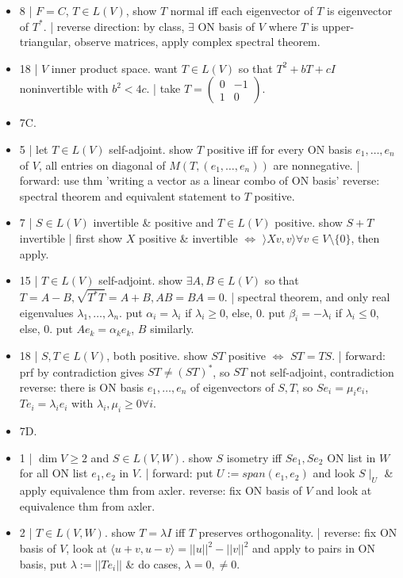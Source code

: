 \begin{itemize}
	\item 8 | $F=C$, $T \in L(V)$, show $T$ normal iff each eigenvector of $T$ is eigenvector of $T^*$. | reverse direction: by class, $\exists$ ON basis of $V$ where $T$ is upper-triangular, observe matrices, apply complex spectral theorem. 
	\item 18 | $V$ inner product space. want $T \in L(V)$ so that $T^2 + bT + cI$ noninvertible with $b^2 < 4c$. | take $T = \begin{pmatrix} 0 & -1 \\ 1 & 0 \end{pmatrix}$. 
	\item 7C. 
	\item 5 | let $T \in L(V)$ self-adjoint. show $T$ positive iff for every ON basis $e_1,\dots,e_n$ of $V$, all entries on diagonal of $M(T,(e_1,\dots,e_n))$ are nonnegative. | forward: use thm 'writing a vector as a linear combo of ON basis' reverse: spectral theorem and equivalent statement to $T$ positive. 
	\item 7 | $S \in L(V)$ invertible \& positive and $T \in L(V)$ positive. show $S+T$ invertible | first show $X$ positive \& invertible $\iff$ $\rangle Xv,v \rangle \forall v \in V \setminus \{0\}$, then apply. 
	\item 15 | $T \in L(V)$ self-adjoint. show $\exists A,B \in L(V)$ so that $T=A-B, \sqrt{T^*T} = A+B, AB=BA=0$. | spectral theorem, and only real eigenvalues $\lambda_1,\dots,\lambda_n$. put $\alpha_i = \lambda_i$ if $\lambda_i \geq 0$, else, 0. put $\beta_i = -\lambda_i$ if $\lambda_i \leq 0$, else, 0. put $Ae_k = \alpha_ke_k$, $B$ similarly. 
	\item 18 | $S,T \in L(V)$, both positive. show $ST$ positive $\iff$ $ST=TS$. | forward: prf by contradiction gives $ST \neq (ST)^*$, so $ST$ not self-adjoint, contradiction reverse: there is ON basis $e_1,\dots,e_n$ of eigenvectors of $S,T$, so $Se_i = \mu_ie_i$, $Te_i = \lambda_ie_i$ with $\lambda_i,\mu_i \geq 0 \forall i$. 
	\item 7D. 
	\item 1 | $\dim V \geq 2$ and $S \in L(V,W)$. show $S$ isometry iff $Se_1,Se_2$ ON list in $W$ for all ON list $e_1,e_2$ in $V$. | forward: put $U := span(e_1,e_2)$ and look $S \mid_U$ \& apply equivalence thm from axler. reverse: fix ON basis of $V$ and look at equivalence thm from axler. 
	\item 2 | $T \in L(V,W)$. show $T = \lambda I$ iff $T$ preserves orthogonality. | reverse: fix ON basis of $V$, look at $\langle u+v,u-v \rangle = ||u||^2 - ||v||^2$ and apply to pairs in ON basis, put $\lambda := ||Te_i||$ \& do cases, $\lambda=0,\neq 0$. 

\end{itemize}
